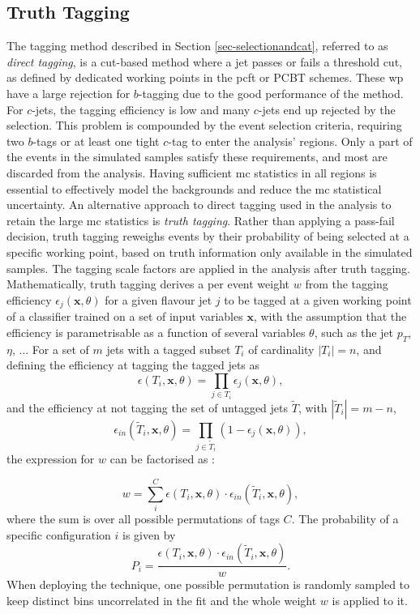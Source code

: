 \subsection{Truth Tagging}\label{app-truth-tagging}
The tagging method described in Section \ref{sec-selectionandcat}, referred to as \textit{direct tagging}, is a cut-based method where a jet passes or fails a threshold cut, as defined by dedicated working points in the \gls{pcft} or PCBT schemes. These \gls{wp} have a large rejection for $b$-tagging due to the good performance of the method. For $c$-jets, the tagging efficiency is low and many $c$-jets end up rejected by the selection. This problem is compounded by the event selection criteria, requiring two $b$-tags or at least one tight $c$-tag to enter the analysis' regions. Only a part of the events in the simulated samples satisfy these requirements, and most are discarded from the analysis. Having sufficient \gls{mc} statistics in all regions is essential to effectively model the backgrounds and reduce the \gls{mc} statistical uncertainty. An alternative approach to direct tagging used in the analysis to retain the large \gls{mc} statistics is \textit{truth tagging}. Rather than applying a pass-fail decision, truth tagging reweighs events by their probability of being selected at a specific working point, based on truth information only available in the simulated samples. The tagging scale factors are applied in the analysis after truth tagging. \\

Mathematically, truth tagging derives a per event weight $w$ from the tagging efficiency $\epsilon_j(\textbf{x}, \theta)$ for a given flavour jet $j$ to be tagged at a given working point of a classifier trained on a set of input variables $\textbf{x}$, with the assumption that the efficiency is parametrisable as a function of several variables $\theta$, such as the jet $p_T$, $\eta$, ... For a set of $m$ jets with a tagged subset $T_i$ of cardinality $|T_i| = n$, and defining the efficiency at tagging the tagged jets as \[\epsilon(T_i,\textbf{x},\theta) = \prod_{j\in T_i} \epsilon_j(\textbf{x},\theta),\] and the efficiency at not tagging the set of untagged jets $\tilde{T}$, with $|\tilde{T}_i| = m-n$, \[ \epsilon_{in}(\tilde{T}_i,\textbf{x}, \theta) = \prod_{j\in \tilde{T}_i} (1-\epsilon_j(\textbf{x}, \theta)),\] the expression for $w$ can be factorised as \cite{ATL-PHYS-PUB-2022-041}: 

\begin{equation}
  \label{eq:truthtagging1}
      w = \sum_i^C \epsilon(T_i,\textbf{x},\theta)\cdot \epsilon_{in}(\tilde{T}_i,\textbf{x},\theta),
  \end{equation}
where the sum is over all possible permutations of tags $C$. The probability of a specific configuration $i$ is given by \[ P_i = \frac{ \epsilon(T_i,\textbf{x},\theta)\cdot \epsilon_{in}(\tilde{T}_i,\textbf{x},\theta)}{w}.\] When deploying the technique, one possible permutation is randomly sampled to keep distinct bins uncorrelated in the fit and the whole weight $w$ is applied to it. \\

